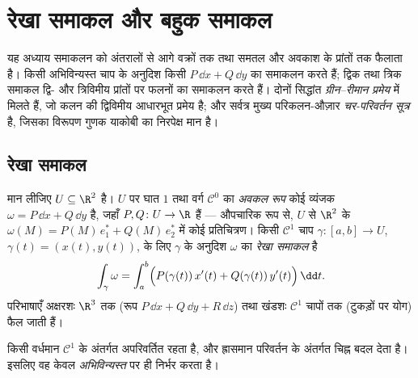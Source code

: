 \chapter{रेखा समाकल और बहुक समाकल}\label{ch:b2:multint}

यह अध्याय समाकलन को अंतरालों से आगे वक्रों तक तथा समतल और अवकाश के
प्रांतों तक फैलाता है।  किसी अभिविन्यस्त चाप के अनुदिश
किसी \emph{} $P\,\dd x + Q\,\dd y$ का समाकलन करते हैं; द्विक तथा त्रिक समाकल
द्वि- और त्रिविमीय प्रांतों पर फलनों का समाकलन करते हैं। दोनों
सिद्धांत \emph{ग्रीन--रीमान प्रमेय} में मिलते हैं, जो कलन की
द्विविमीय आधारभूत प्रमेय है; और सर्वत्र मुख्य परिकलन-औज़ार
\emph{चर-परिवर्तन सूत्र} है, जिसका विरूपण गुणक याकोबी  का
निरपेक्ष मान है।

\section{रेखा समाकल}

\begin{definition}[अवकल रूप; रेखा समाकल]\label{def:b2:multint:lineint}
मान लीजिए $U \subseteq \R^2$  है। $U$ पर घात $1$ तथा वर्ग $\mathcal{C}^0$ का
\emph{अवकल रूप} कोई व्यंजक $\omega = P\,\dd x + Q\,\dd y$ है, जहाँ $P, Q \colon U \to \R$ 
हैं --- औपचारिक रूप से, $U$ से $\R^2$ के  $\omega(M) = P(M)\,e_1^* + Q(M)\,e_2^*$ में कोई 
प्रतिचित्रण। किसी $\mathcal{C}^1$ चाप $\gamma \colon [a, b] \to U$, $\gamma(t) =
(x(t), y(t))$, के लिए $\gamma$ के अनुदिश
$\omega$ का \emph{रेखा समाकल} है
\[
\int_\gamma \omega
= \int_a^b \Bigl(P(\gamma(t))\,x'(t)
+ Q(\gamma(t))\,y'(t)\Bigr)\,\dd t .
\]
परिभाषाएँ अक्षरशः $\R^3$ तक (रूप $P\,\dd x +
Q\,\dd y + R\,\dd z$) तथा खंडशः $\mathcal{C}^1$ चापों तक
(टुकड़ों पर योग) फैल जाती हैं।
\end{definition}

\begin{proposition}[अपरिवर्त्यता और अभिविन्यास]\label{prop:b2:multint:lineinv}
 किसी वर्धमान $\mathcal{C}^1$  के अंतर्गत अपरिवर्तित
रहता है, और ह्रासमान परिवर्तन के अंतर्गत चिह्न बदल देता है। इसलिए
वह केवल \emph{अभिविन्यस्त}  पर ही निर्भर करता है।
\end{proposition}

